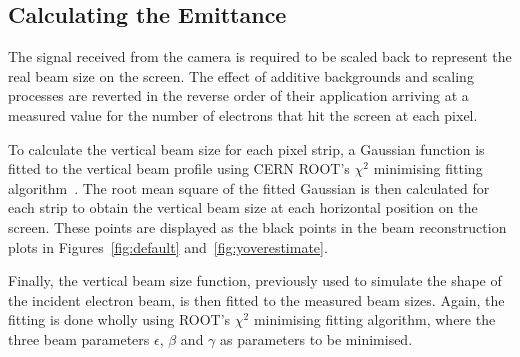 \subsection{Calculating the Emittance}

The signal received from the camera is required to be scaled back to represent
the real beam size on the screen. The effect of additive backgrounds and scaling
processes are reverted in the reverse order of their application arriving at a
measured value for the number of electrons that hit the screen at each pixel.

To calculate the vertical beam size for each pixel strip, a Gaussian function is
fitted to the vertical beam profile using CERN ROOT's \(\chi^2\) minimising
fitting algorithm~\cite{Brun:1997pa}.
The root mean square of the fitted
Gaussian is then calculated for each strip to obtain the vertical beam size at
each horizontal position on the screen. These points are displayed as the black
points in the beam reconstruction plots in Figures~\ref{fig:default}
and~\ref{fig:yoverestimate}.

Finally, the vertical beam size function, previously used to simulate the shape
of the incident electron beam, is then fitted to the measured beam sizes. Again,
the fitting is done wholly using ROOT's \(\chi^2\) minimising fitting algorithm,
where the three beam parameters \(\epsilon\), \(\beta\) and \(\gamma\) as
parameters to be minimised.

